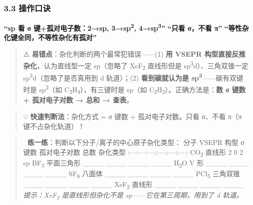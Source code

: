 \documentclass[a4paper,11pt]{ctexart}
\begin{document}
\subsubsection{3.3 操作口诀}\label{ux64cdux4f5cux53e3ux8bc0}

\textbf{``sp 看 σ 键+孤对电子数：2→sp, 3→sp\textsuperscript{2}, 4→sp\textsuperscript{3}''}
\textbf{``只看 σ，不看 π''}
\textbf{``等性杂化键全同，不等性杂化有孤对''}

\begin{quote}
⚠️ \textbf{易错点}：杂化判断的两个最常犯错误------(1) \textbf{用 VSEPR 构型直接反推杂化}，认为直线型一定 sp（忽略了 XeF\textsubscript{2} 直线形但是 sp\textsuperscript{3}d）、三角双锥一定 sp\textsuperscript{3}d（忽略了是否真用到 d 轨道）；(2) \textbf{看到碳就认为是 sp\textsuperscript{3}}------碳有双键时是 sp\textsuperscript{2}（如 C\textsubscript{2}H\textsubscript{4}），有三键时是 sp（如 C\textsubscript{2}H\textsubscript{2}）。正确方法是：\textbf{数 σ 键数 + 孤对电子对数 → 总和 → 查表}。
\end{quote}

\begin{quote}
💡 \textbf{快速判断法}：杂化方式 = σ 键数 + 孤对电子对数。只看 σ、不看 π（π 键不占杂化轨道）！
\end{quote}

\begin{quote}
📝 \textbf{练一练}：判断以下分子/离子的中心原子杂化类型：
\textbar{} 分子 \textbar{} VSEPR 构型 \textbar{} σ 键数 \textbar{} 孤对电子对数 \textbar{} 总数 \textbar{} 杂化类型 \textbar{}
\textbar:---\textbar:---\textbar:---:\textbar:---:\textbar:---:\textbar:---:\textbar{}
\textbar{} CO\textsubscript{2} \textbar{} 直线形 \textbar{} 2 \textbar{} 0 \textbar{} 2 \textbar{} sp \textbar{}
\textbar{} BF\textsubscript{3} \textbar{} 平面三角形 \textbar{} \_\_\_\_ \textbar{} \_\_\_\_ \textbar{} \_\_\_\_ \textbar{} \_\_\_\_ \textbar{}
\textbar{} H\textsubscript{2}O \textbar{} V 形 \textbar{} \_\_\_\_ \textbar{} \_\_\_\_ \textbar{} \_\_\_\_ \textbar{} \_\_\_\_ \textbar{}
\textbar{} SF\textsubscript{6} \textbar{} 八面体 \textbar{} \_\_\_\_ \textbar{} \_\_\_\_ \textbar{} \_\_\_\_ \textbar{} \_\_\_\_ \textbar{}
\textbar{} PCl\textsubscript{5} \textbar{} 三角双锥 \textbar{} \_\_\_\_ \textbar{} \_\_\_\_ \textbar{} \_\_\_\_ \textbar{} \_\_\_\_ \textbar{}
\textbar{} XeF\textsubscript{2} \textbar{} 直线形 \textbar{} \_\_\_\_ \textbar{} \_\_\_\_ \textbar{} \_\_\_\_ \textbar{} \_\_\_\_ \textbar{}
\emph{提示：XeF\textsubscript{2} 是直线形但杂化不是 sp------它在第三周期，用到了 d 轨道。}
\end{quote}
\end{document}
